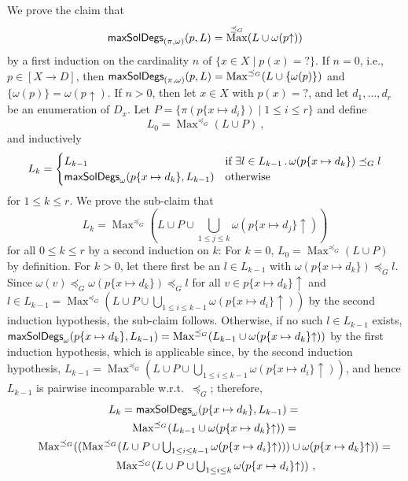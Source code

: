 \documentclass[english]{notes}
\newcommand{\macit}[1]{{\frenchspacing\ensuremath{\normalfont\textsf{#1}}}}
\DeclareMathOperator{\Maxop}{\mathrm{Max}}
\newcommand{\Max}[1]{\Maxop^{#1}}
\begin{document}
We prove the claim that
%
\begin{equation*}
  \macit{maxSolDegs}_{(\pi, \omega)}(p, L) = \Max{\preceq_G} (L \cup \omega(p{\uparrow}))
\end{equation*}
%
by a first induction on the cardinality $n$ of $\{ x \in X \mid p(x) =
{?}  \}$.  If $n = 0$, i.e., $p \in [X \to D]$, then
$\macit{maxSolDegs}_{(\pi, \omega)}(p, L) = \Max{\preceq_G} (L \cup \{
\omega(p) \})$ and $\{ \omega(p) \} = \omega(p{\uparrow})$.  If $n >
0$, then let $x \in X$ with $p(x) = {?}$, and let $d_1, \ldots, d_r$
be an enumeration of $D_x$.  Let $P = \{ \pi(p\{ x \mapsto d_i \})
\mid 1 \leq i \leq r \}$ and define
%
\begin{equation*}
  L_0 = \Max{\preceq_G} (L \cup P)
\ \text{,}
\end{equation*}
%
and inductively
%
\begin{equation*}
  L_k =
\begin{cases}
  L_{k-1} & \text{if $\exists l \in L_{k-1} \,.\, \omega(p\{ x \mapsto d_k \}) \preceq_G l$}
\\
  \macit{maxSolDegs}_{\omega}(p\{ x \mapsto d_k \}, L_{k-1}) & \text{otherwise}
\end{cases}
\end{equation*}
%
for $1 \leq k \leq r$.  We prove the sub-claim that
%
\begin{equation*}\textstyle
  L_k = \Max{\preceq_G} (L \cup P \cup \bigcup_{1 \leq j \leq k} \omega(p\{ x \mapsto d_j \}{\uparrow}))
\end{equation*}
%
for all $0 \leq k \leq r$ by a second induction on $k$: For $k = 0$,
$L_0 = \Max{\preceq_G} (L \cup P)$ by definition.  For $k > 0$, let
there first be an $l \in L_{k-1}$ with $\omega(p\{ x \mapsto d_k \})
\preceq_G l$.  Since $\omega(v) \preceq_G \omega(p\{ x \mapsto d_k \})
\preceq_G l$ for all $v \in p\{ x \mapsto d_k \}{\uparrow}$ and $l \in
L_{k-1} = \Max{\preceq_G} (L \cup P \cup \bigcup_{1 \leq i \leq k-1}
\omega(p\{ x \mapsto d_i \}{\uparrow}))$ by the second induction
hypothesis, the sub-claim follows.  Otherwise, if no such $l \in
L_{k-1}$ exists, $\macit{maxSolDegs}_{\omega}(p\{ x \mapsto d_k \},
L_{k-1}) = \Max{\preceq_G} (L_{k-1} \cup \omega(p\{ x \mapsto d_k
\}{\uparrow}))$ by the first induction hypothesis, which is applicable
since, by the second induction hypothesis, $L_{k-1} = \Max{\preceq_G}
(L \cup P \cup \bigcup_{1 \leq i \leq k-1} \omega(p\{ x \mapsto d_i
\}{\uparrow}))$, and hence $L_{k-1}$ is pairwise incomparable w.r.t.\
$\preceq_G$; therefore,
%
\begin{gather*}
\textstyle
  L_k
=
  \macit{maxSolDegs}_{\omega}(p\{ x \mapsto d_k \}, L_{k-1})
={}\\\textstyle\qquad
  \Max{\preceq_G} (L_{k-1} \cup \omega(p\{ x \mapsto d_k \}{\uparrow}))
={}\\\textstyle\qquad
  \Max{\preceq_G} ((\Max{\preceq_G} (L \cup P \cup \bigcup_{1 \leq i \leq k-1} \omega(p\{ x \mapsto d_i \}{\uparrow}))) \cup \omega(p\{ x \mapsto d_k \}{\uparrow}))
={}\\\textstyle\qquad
  \Max{\preceq_G} (L \cup P \cup \bigcup_{1 \leq i \leq k} \omega(p\{ x \mapsto d_i \}{\uparrow}))
\ \text{,}
\end{gather*}
\end{document}
